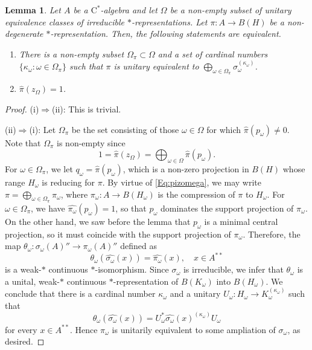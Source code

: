 \documentclass[10pt]{amsart}
\newcommand{\rC}{\mathrm{C}}
\newtheorem{lemma}{Lemma}[section]
\theoremstyle{definition}
\begin{document}
\begin{lemma}\label{L:atomic}
Let $A$ be a $\rC^*$-algebra and let $\Omega$ be a non-empty subset of unitary equivalence classes of irreducible $*$-representations. Let $\pi:A\to B(H)$ be a non-degenerate $*$-representation. Then, the following statements are equivalent.
\begin{enumerate}[{\rm (i)}]
\item There is a non-empty subset $\Omega_\pi\subset \Omega$ and a set of cardinal numbers $\{\kappa_\omega:\omega\in \Omega_\pi\}$ such that $\pi$ is unitary equivalent to $\bigoplus_{\omega\in \Omega_\pi}\sigma^{(\kappa_\omega)}_\omega$.
\item $\widehat\pi(z_\Omega)=1$.
\end{enumerate}
\end{lemma}
\begin{proof}
(i)$\Rightarrow$(ii): This is trivial.

(ii)$\Rightarrow$(i): Let $\Omega_\pi$ be the set consisting of those $\omega\in \Omega$ for which $\widehat\pi(p_\omega)\neq 0$. Note that $\Omega_\pi$ is non-empty since 
\begin{equation}\label{Eq:pizomega}
1=\widehat\pi(z_\Omega)=\bigoplus_{\omega\in \Omega}\widehat\pi(p_\omega).
\end{equation}
For $\omega\in \Omega_\pi$, we let $q_\omega=\widehat\pi(p_\omega)$, which is a non-zero projection in $B(H)$ whose range $H_\omega$ is reducing for $\pi$. By virtue of \eqref{Eq:pizomega}, we may write $\pi=\bigoplus_{\omega\in \Omega_\pi} \pi_\omega$, where $\pi_\omega:A\to B(H_\omega)$ is the compression of $\pi$ to $H_\omega$. For $\omega\in \Omega_\pi$, we have $\widehat{\pi_\omega}(p_\omega)=1$, so that $p_\omega$ dominates the support projection of $\pi_\omega$. On the other hand, we saw before the lemma that $p_\omega$ is a minimal central projection, so it must coincide with the support projection of $\pi_\omega$. Therefore, the map $\theta_\omega: \sigma_\omega(A)''\to \pi_\omega(A)''$ defined as
\[
\theta_\omega(\widehat{\sigma_\omega}(x))=\widehat{\pi_\omega}(x),\quad x\in A^{**}
\]
is  a weak-$*$ continuous $*$-isomorphism. Since $\sigma_\omega$ is irreducible, we infer that $\theta_\omega$ is a unital, weak-$*$ continuous $*$-representation of $B(K_\omega)$ into $B(H_\omega)$.  We conclude that there is a cardinal number $\kappa_\omega$ and a unitary $U_\omega: H_\omega\to K_\omega^{(\kappa_\omega)}$ such that
\[
\theta_\omega(\widehat{\sigma_\omega}(x))= U_\omega^*\widehat{\sigma_\omega}(x)^{(\kappa_\omega)} U_\omega
\]
for every $x\in A^{**}$. 
Hence $\pi_\omega$ is unitarily equivalent to some ampliation of $\sigma_\omega$, as desired.
\end{proof}
\end{document}
